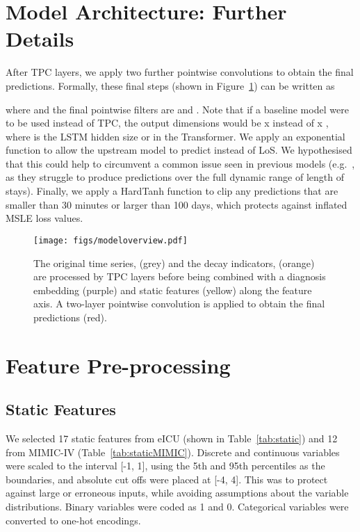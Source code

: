 \documentclass[sigconf]{acmart}
\begin{document}
\appendix

\section{Model Architecture: Further Details}
\label{sec:fullmodel}
After  TPC layers, we apply two further pointwise convolutions to obtain the final predictions. Formally, these final steps (shown in Figure~\ref{fig:modeloverview}) can be written as

where  and the final pointwise filters are  and . Note that if a baseline model were to be used instead of TPC, the output dimensions would be  x  instead of  x , where  is the LSTM hidden size or  in the Transformer. We apply an exponential function to allow the upstream model to predict  instead of LoS. We hypothesised that this could help to circumvent a common issue seen in previous models (e.g.\ \citet{harutyunyan}, as they struggle to produce predictions over the full dynamic range of length of stays). Finally, we apply a HardTanh function \citep{DBLP:journals/corr/GulcehreMDB16} to clip any predictions that are smaller than 30 minutes or larger than 100 days, which protects against inflated MSLE loss values.


\begin{figure}
\centering
\hspace{5em}\texttt{[image: figs/modeloverview.pdf]}
\caption{The original time series,  (grey) and the decay indicators,  (orange) are processed by  TPC layers before being combined with a diagnosis embedding  (purple) and static features  (yellow) along the feature axis. A two-layer pointwise convolution is applied to obtain the final predictions  (red).}
\label{fig:modeloverview}
\end{figure}

\section{Feature Pre-processing}
\label{preproc}
\subsection{Static Features}
We selected 17 static features from eICU (shown in Table~\ref{tab:static}) and 12 from MIMIC-IV (Table~\ref{tab:staticMIMIC}). Discrete and continuous variables were scaled to the interval [-1, 1], using the 5th and 95th percentiles as the boundaries, and absolute cut offs were placed at [-4, 4]. This was to protect against large or erroneous inputs, while avoiding assumptions about the variable distributions. Binary variables were coded as 1 and 0. Categorical variables were converted to one-hot encodings.
\end{document}
